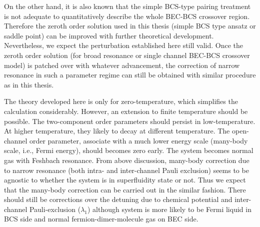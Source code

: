        On the other hand, it is also known that the simple BCS-type pairing treatment is not adequate  to quantitatively describe the whole BEC-BCS crossover region.  Therefore the zeroth order solution used in this thesis (simple BCS type ansatz or saddle point) can be improved with further theoretical development.  Nevertheless, we expect the perturbation established here still valid.  Once the zeroth order solution (for broad resonance or single channel BEC-BCS crossover model) is patched over with whatever advancement, the correction of narrow resonance in such a parameter regime can still be obtained with similar procedure as in this thesis.  
       
       
\begin{unsure}
The theory developed here is only for zero-temperature, which simplifies the calculation considerably.  However, an extension to finite temperature should be possible.  The two-component order parameters should persist in low-temperature.  At higher temperature, they likely to decay at different temperature.  The open-channel order parameter, associate with a much lower energy scale (many-body scale, i.e., Fermi energy), should becomes zero early.  The system becomes normal gas with Feshbach resonance.  From above discussion, many-body correction due to narrow resonance (both intra- and inter-channel Pauli exclusion) seems to be agnostic to whether the system is in superfluidity state or not.  Thus we expect that the many-body correction can be carried out in the similar fashion.   There should still be corrections over the detuning due to chemical potential and inter-channel Pauli-exclusion ($\lambda_{1}$) although system is more likely to be Fermi liquid in BCS side and normal fermion-dimer-molecule gas on BEC side.   
\end{unsure}
